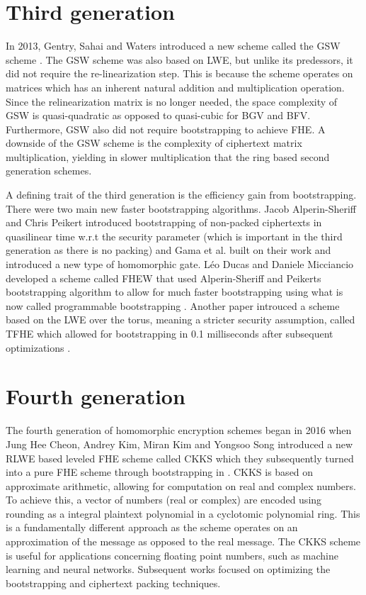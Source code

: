 \section{Third generation}
In 2013, Gentry, Sahai and Waters introduced a new scheme called the GSW scheme \cite{GSW13}. The GSW scheme was also based on LWE, but unlike its predessors, it did not require the re-linearization step. This is because the scheme operates on matrices which has an inherent natural addition and multiplication operation. Since the relinearization matrix is no longer needed, the space complexity of GSW is quasi-quadratic as opposed to quasi-cubic for BGV and BFV. Furthermore, GSW also did not require bootstrapping to achieve FHE. A downside of the GSW scheme is the complexity of ciphertext matrix multiplication, yielding in slower multiplication that the ring based second generation schemes.

A defining trait of the third generation is the efficiency gain from bootstrapping. There were two main new faster bootstrapping algorithms. Jacob Alperin-Sheriff and Chris Peikert \cite{A-S-P-boot} introduced bootstrapping of non-packed ciphertexts in quasilinear time w.r.t the security parameter (which is important in the third generation as there is no packing) and Gama et al. \cite{Gama-boot} built on their work and introduced a new type of homomorphic gate. Léo Ducas and Daniele Micciancio developed a scheme called FHEW that used Alperin-Sheriff and Peikerts bootstrapping algorithm to allow for much faster bootstrapping using what is now called programmable bootstrapping \cite{FHEW}. Another paper introuced a scheme based on the LWE over the torus, meaning a stricter security assumption, called TFHE \cite{TFHE} which allowed for bootstrapping in 0.1 milliseconds after subsequent optimizations \cite{MP-fhew-tfhe}.

\section{Fourth generation}
The fourth generation of homomorphic encryption schemes began in 2016 when Jung Hee Cheon, Andrey Kim, Miran Kim and Yongsoo Song introduced a new RLWE based leveled FHE scheme called CKKS \cite{CKKS16} which they subsequently turned into a pure FHE scheme through bootstrapping in \cite{CKKS-boot}. CKKS is based on approximate arithmetic, allowing for computation on real and complex numbers. To achieve this, a vector of numbers (real or complex) are encoded using rounding as a integral plaintext polynomial in a cyclotomic polynomial ring. This is a fundamentally different approach as the scheme operates on an approximation of the message as opposed to the real message. The CKKS scheme is useful for applications concerning floating point numbers, such as machine learning and neural networks. Subsequent works focused on optimizing the bootstrapping and ciphertext packing techniques.

